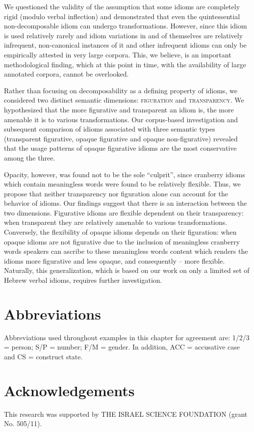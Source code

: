 \documentclass[output=paper]{langsci/langscibook}
\begin{document}
We questioned the validity of the assumption that some idioms are completely rigid (modulo verbal inflection) and demonstrated that even the quintessential non-decomposable idiom  can undergo transformations. However, since this idiom is used relatively rarely and idiom variations in and of themselves are relatively infrequent, non-canonical instances of it and other infrequent idioms can only be empirically attested in very large corpora. This, we believe, is an important methodological finding, which at this point in time, with the availability of large annotated corpora, cannot be overlooked.

Rather than focusing on decomposability as a defining property of idioms, we considered two distinct semantic dimensions: {\scshape figuration} and {\scshape transparency}. We hypothesized that the more figurative and transparent an idiom is, the more amenable it is to various transformations. Our corpus-based investigation and subsequent comparison of idioms associated with three semantic types (transparent figurative, opaque figurative and opaque non-figurative) revealed that the usage patterns of opaque figurative idioms are the most conservative among the three.

Opacity, however, was found not to be the sole ``culprit'', since cranberry idioms which contain meaningless words were found to be relatively flexible. Thus, we propose that neither transparency nor figuration alone can account for the behavior of idioms. Our findings suggest that there is an interaction between the two dimensions. Figurative idioms are flexible dependent on their transparency: when transparent they are relatively amenable to various transformations. Conversely, the flexibility of opaque idioms depends on their figuration: when opaque idioms are not figurative due to the inclusion of meaningless cranberry words speakers can ascribe to these meaningless words content which renders the idioms more figurative and less opaque, and consequently -- more flexible. Naturally, this generalization, which is based on our work on only a limited set of Hebrew verbal idioms, requires further investigation.





\section*{Abbreviations}
Abbreviations used throughout examples in this chapter for agreement are: 1/2/3 = person; S/P = number; F/M = gender. In addition, ACC = accusative case and CS = construct state.
\section*{Acknowledgements}
This research was supported by THE ISRAEL SCIENCE FOUNDATION (grant No. 505/11).


\printbibliography[heading=subbibliography,notkeyword=this]
\end{document}
